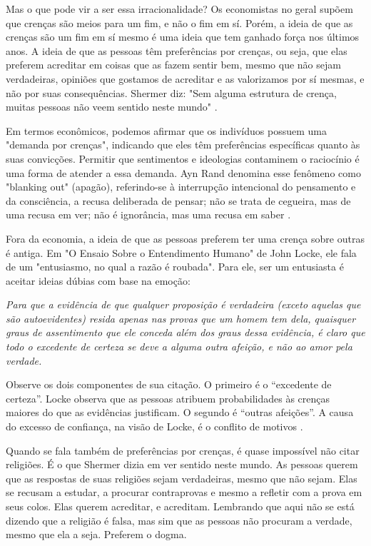 Mas o que pode vir a ser essa irracionalidade? Os economistas no geral supõem que crenças são meios para um fim, e não o fim em sí. Porém, a ideia de que as crenças são um fim em sí mesmo é uma ideia que tem ganhado força nos últimos anos. A ideia de que as pessoas têm preferências por crenças, ou seja, que elas preferem acreditar em coisas que as fazem sentir bem, mesmo que não sejam verdadeiras, opiniões que gostamos de acreditar e as valorizamos por sí mesmas, e não por suas consequências. Shermer diz: "Sem alguma estrutura de crença, muitas pessoas não veem sentido neste mundo" \cite{shermer2002people}.

Em termos econômicos, podemos afirmar que os indivíduos possuem uma "demanda por crenças", indicando que eles têm preferências específicas quanto às suas convicções. Permitir que sentimentos e ideologias contaminem o raciocínio é uma forma de atender a essa demanda. Ayn Rand denomina esse fenômeno como "blanking out" (apagão), referindo-se à interrupção intencional do pensamento e da consciência, a recusa deliberada de pensar; não se trata de cegueira, mas de uma recusa em ver; não é ignorância, mas uma recusa em saber \cite{rand1992atlas}.

Fora da economia, a ideia de que as pessoas preferem ter uma crença sobre outras é antiga. Em "O Ensaio Sobre o Entendimento Humano" de John Locke, ele fala de um "entusiasmo, no qual a razão é roubada". Para ele, ser um entusiasta é aceitar ideias dúbias com base na emoção:

\begin{citacao}
    \textit{
        Para que a evidência de que qualquer proposição é verdadeira (exceto aquelas que são autoevidentes) resida apenas nas provas que um homem tem dela, quaisquer graus de assentimento que ele conceda além dos graus dessa evidência, é claro que todo o excedente de certeza se deve a alguma outra afeição, e não ao amor pela verdade.
    } \newline
    \cite{locke2014ensaio}
\end{citacao}

Observe os dois componentes de sua citação. O primeiro é o “excedente de certeza”. Locke observa que as pessoas atribuem probabilidades às crenças maiores do que as evidências justificam. O segundo é “outras afeições”. A causa do excesso de confiança, na visão de Locke, é o conflito de motivos \cite{The_Myth_of_the_Rational_Voter,locke2014ensaio}. 

Quando se fala também de preferências por crenças, é quase impossível não citar religiões. É o que Shermer dizia em ver sentido neste mundo. As pessoas querem que as respostas de suas religiões sejam verdadeiras, mesmo que não sejam. Elas se recusam a estudar, a procurar contraprovas e mesmo a refletir com a prova em seus colos. Elas querem acreditar, e acreditam. Lembrando que aqui não se está dizendo que a religião é falsa, mas sim que as pessoas  não procuram a verdade, mesmo que ela a seja. Preferem o dogma.

